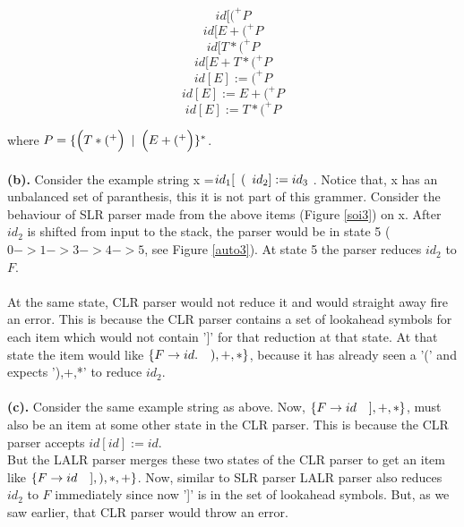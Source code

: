 \documentclass{article}
\newcommand\tab[1][5pt]{\hspace*{#1}}
\begin{document}
$$id[(^+ P $$
$$id[ E + (^+ P$$
$$id[ T \ast (^+ P$$
$$id[ E + T \ast (^+ P$$
$$id[E] :=  (^+ P$$
$$id[E] :=  E + (^+ P$$
$$id[E] :=  T \ast (^+ P$$

where $P =\{ \Big(T \ast (^+ \Big)\tab  | \tab \Big(E + (^+ \Big) \}^*$. \\ \\
\textbf{(b).} Consider the example string x =$id_1 [\tab ( \tab id_2 ] := id_3$ . Notice that, x has an unbalanced set of paranthesis, this it is not part of this grammer. Consider the behaviour of SLR parser made from the above items (Figure \ref{soi3}) on x. After $id_2$ is shifted from input to the stack, the parser would be in state 5 ($0-> 1-> 3-> 4-> 5$, see Figure \ref{auto3}). At state 5 the parser reduces $id_2$ to $F$.\\ \\
At the same state, CLR parser would not reduce it and would straight away fire an error. This is because the CLR parser contains a set of lookahead symbols for each item which would not contain ']' for that reduction at that state. At that state the item would like $\{F \rightarrow id. \tab \tab ),+,*\}$, because it has already seen a '(' and expects '),+,*' to reduce $id_2$.\\ \\
\textbf{(c).} Consider the same example string as above. Now, $\{F \rightarrow id \tab \tab ],+,*\}$, must also be an item  at some other state in the CLR parser. This is because the CLR parser accepts $id[id] := id $. \\

But the LALR parser merges these two states of the CLR parser to get an item like $\{F \rightarrow id \tab \tab ],),*,+ \}$. Now, similar to SLR parser LALR parser also reduces $id_2$ to $F$ immediately since now ']' is in the set of lookahead symbols. But, as we saw earlier, that CLR parser would throw an error.
\end{document}
